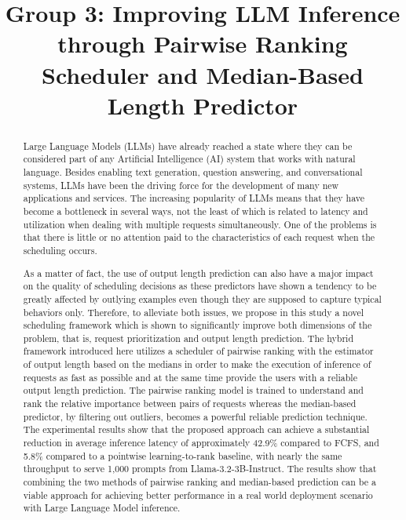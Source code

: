 \documentclass[conference]{IEEEtran}
\begin{document}
\title{Group 3: Improving LLM Inference through Pairwise Ranking Scheduler and Median-Based Length Predictor}

\author{
}

\maketitle

\begin{abstract}
Large Language Models (LLMs) have already reached a state where they can be considered part of any Artificial Intelligence (AI) system that works with natural language. Besides enabling text generation, question answering, and conversational systems, LLMs have been the driving force for the development of many new applications and services. The increasing popularity of LLMs means that they have become a bottleneck in several ways, not the least of which is related to latency and utilization when dealing with multiple requests simultaneously. One of the problems is that there is little or no attention paid to the characteristics of each request when the scheduling occurs.

As a matter of fact, the use of output length prediction can also have a major impact on the quality of scheduling decisions as these predictors have shown a tendency to be greatly affected by outlying examples even though they are supposed to capture typical behaviors only. Therefore, to alleviate both issues, we propose in this study a novel scheduling framework which is shown to significantly improve both dimensions of the problem, that is, request prioritization and output length prediction. The hybrid framework introduced here utilizes a scheduler of pairwise ranking with the estimator of output length based on the medians in order to make the execution of inference of requests as fast as possible and at the same time provide the users with a reliable output length prediction. The pairwise ranking model is trained to understand and rank the relative importance between pairs of requests whereas the median-based predictor, by filtering out outliers, becomes a powerful reliable prediction technique. The experimental results show that the proposed approach can achieve a substantial reduction in average inference latency of approximately 42.9\% compared to FCFS, and 5.8\% compared to a pointwise learning-to-rank baseline, with nearly the same throughput to serve 1,000 prompts from Llama-3.2-3B-Instruct. The results show that combining the two methods of pairwise ranking and median-based prediction can be a viable approach for achieving better performance in a real world deployment scenario with Large Language Model inference.
\end{abstract}
\end{document}
